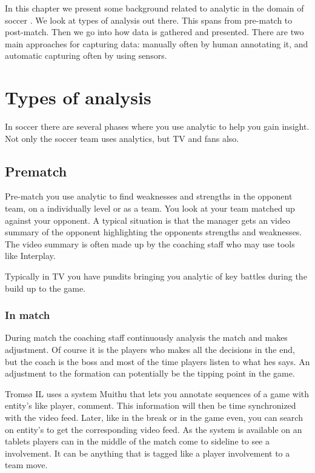 

In this chapter we present some background related to analytic in the domain of soccer . We look at types of analysis out there. This spans from pre-match to post-match. Then we go into how data is gathered and presented. There are two main approaches for capturing data: manually often by human annotating it, and automatic capturing often by using sensors.

\section{Types of analysis}

In soccer there are several phases where you use analytic to help you gain insight. Not only the soccer team uses analytics, but TV and fans also.

\subsection{Prematch}

Pre-match you use analytic to find weaknesses and strengths in the opponent team, on a individually level or as a team. You look at your team matched up against your opponent. A typical situation is that the manager gets an video summary of the opponent highlighting the opponents strengths and weaknesses. The video summary is often made up by the coaching staff who may use tools like Interplay. 

Typically in TV you have pundits bringing you analytic of key battles during the build up to the game. 

\subsubsection{In match}

During match the coaching staff continuously analysis the match and makes adjustment. Of course it is the players who makes all the decisions in the end, but the coach is the boss and most of the time players listen to what hes says. An adjustment to the formation can potentially be the tipping point in the game.

Tromsø IL uses a system Muithu that lets you annotate sequences of a game with entity's like player, comment. This information will then be time synchronized with the video feed. Later, like in the break or in the game even, you can search on entity's to get the corresponding video feed. As the system is available on an tablets players can in the middle of the match come to sideline to see a involvement. It can be anything that is tagged like a player involvement to a team move.


